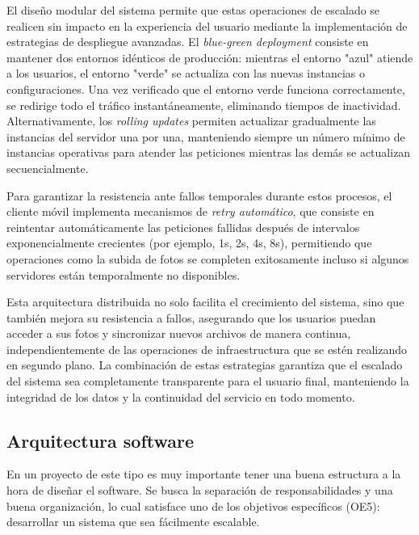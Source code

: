 El diseño modular del sistema permite que estas operaciones de escalado se realicen sin impacto en la experiencia del usuario mediante la implementación de estrategias de despliegue avanzadas. El \textit{blue-green deployment} consiste en mantener dos entornos idénticos de producción: mientras el entorno "azul" atiende a los usuarios, el entorno "verde" se actualiza con las nuevas instancias o configuraciones. Una vez verificado que el entorno verde funciona correctamente, se redirige todo el tráfico instantáneamente, eliminando tiempos de inactividad. Alternativamente, los \textit{rolling updates} permiten actualizar gradualmente las instancias del servidor una por una, manteniendo siempre un número mínimo de instancias operativas para atender las peticiones mientras las demás se actualizan secuencialmente.

Para garantizar la resistencia ante fallos temporales durante estos procesos, el cliente móvil implementa mecanismos de \textit{retry automático}, que consiste en reintentar automáticamente las peticiones fallidas después de intervalos exponencialmente crecientes (por ejemplo, 1s, 2s, 4s, 8s), permitiendo que operaciones como la subida de fotos se completen exitosamente incluso si algunos servidores están temporalmente no disponibles.

Esta arquitectura distribuida no solo facilita el crecimiento del sistema, sino que también mejora su resistencia a fallos, asegurando que los usuarios puedan acceder a sus fotos y sincronizar nuevos archivos de manera continua, independientemente de las operaciones de infraestructura que se estén realizando en segundo plano. La combinación de estas estrategias garantiza que el escalado del sistema sea completamente transparente para el usuario final, manteniendo la integridad de los datos y la continuidad del servicio en todo momento.

\subsection{Arquitectura software}
En un proyecto de este tipo es muy importante tener una buena estructura a la hora de diseñar el software.
Se busca la separación de responsabilidades y una buena organización, lo cual satisface uno de los objetivos específicos (OE5): desarrollar un sistema que sea fácilmente escalable.

